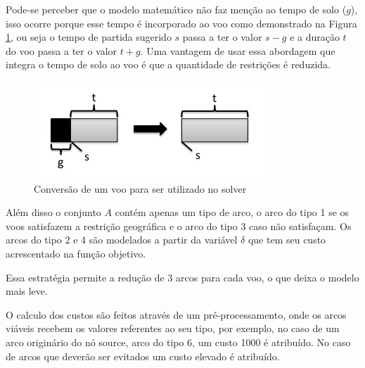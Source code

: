 \clearpage

Pode-se perceber que o modelo matemático não faz menção ao tempo de solo ($g$), isso ocorre porque esse tempo é incorporado ao voo como demonstrado na Figura \ref{fig:conversion}, ou seja o tempo de partida sugerido $s$ passa a ter o valor $s - g$ e a duração $t$ do voo passa a ter o valor $t + g$. Uma vantagem de usar essa abordagem que integra o tempo de solo ao voo é que a quantidade de restrições é reduzida.

\begin{figure}[ht]
	\centering
	\includegraphics[scale=0.4]{./img/conversion}
	\caption{Conversão de um voo para ser utilizado no solver}\label{fig:conversion}
\end{figure}

Além disso o conjunto $A$ contém apenas um tipo de arco, o arco do tipo 1 se os voos satisfazem a restrição geográfica e o arco do tipo 3 caso não satisfaçam. Os arcos do tipo 2 e 4 são modelados a partir  da variável $\delta$ que tem seu custo acrescentado na função objetivo.

Essa estratégia permite a redução de 3 arcos para cada voo, o que deixa o modelo mais leve.

O calculo dos custos são feitos através de um pré-processamento, onde os arcos viáveis recebem os valores referentes ao seu tipo, por exemplo, no caso de um arco originário do nó source, arco do tipo 6, um custo 1000 é atribuído. No caso de arcos que deverão ser evitados um custo elevado é atribuído.
  	